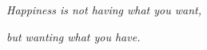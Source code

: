 \begin{flushright}
	\vspace*{3cm}
	\emph{Happiness is not having what you want,}
	
	\emph{but wanting what you have.}
\end{flushright}
